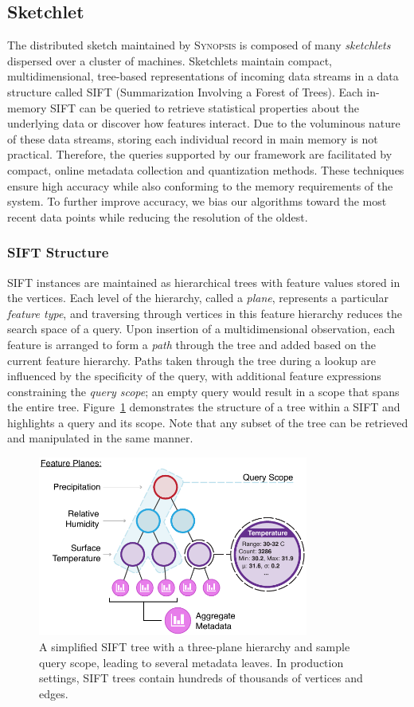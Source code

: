 \subsection{Sketchlet}
\label{sec:sketch}
The distributed sketch maintained by \textsc{Synopsis} is composed of many \emph{sketchlets} dispersed over a cluster of machines. Sketchlets maintain compact, multidimensional, tree-based representations of incoming data streams in a data structure called SIFT (Summarization Involving a Forest of Trees). Each in-memory SIFT can be queried to retrieve statistical properties about the underlying data or discover how features interact. Due to the voluminous nature of these data streams, storing each individual record in main memory is not practical. Therefore, the queries supported by our framework are facilitated by compact, online metadata collection and quantization methods. These techniques ensure high accuracy while also conforming to the memory requirements of the system. To further improve accuracy, we bias our algorithms toward the most recent data points while reducing the resolution of the oldest.

\subsubsection{SIFT Structure}
SIFT instances are maintained as hierarchical trees with feature values stored in the vertices. Each level of the hierarchy, called a \emph{plane}, represents a particular \emph{feature type}, and traversing through vertices in this feature hierarchy reduces the search space of a query. Upon insertion of a multidimensional observation, each feature is arranged to form a \emph{path} through the tree and added based on the current feature hierarchy. Paths taken through the tree during a lookup are influenced by the specificity of the query, with additional feature expressions constraining the \emph{query scope}; an empty query would result in a scope that spans the entire tree. Figure~\ref{fig:sketch} demonstrates the structure of a tree within a SIFT and highlights a query and its scope. Note that any subset of the tree can be retrieved and manipulated in the same manner.

\begin{figure}[b!]
    \centerline{\includegraphics[width=3.5in]{figures/sketch.pdf}}
    \caption{A simplified SIFT tree with a three-plane hierarchy and sample query scope, leading to several metadata leaves. In production settings, SIFT trees contain hundreds of thousands of vertices and edges.}
    \label{fig:sketch}
\end{figure}

